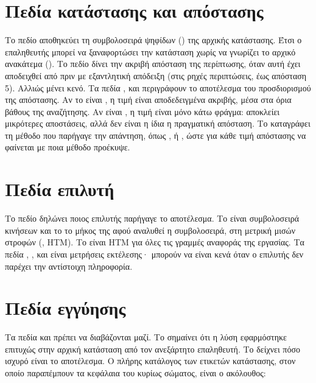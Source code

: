 \section{Πεδία κατάστασης και απόστασης}
\label{sec:schema-distance}
Το πεδίο  αποθηκεύει τη συμβολοσειρά ψηφίδων () της αρχικής κατάστασης. Έτσι ο επαληθευτής μπορεί να ξαναφορτώσει την κατάσταση χωρίς να γνωρίζει το αρχικό ανακάτεμα (). Το πεδίο  δίνει την ακριβή απόσταση της περίπτωσης, όταν αυτή έχει αποδειχθεί από πριν με εξαντλητική απόδειξη (στις ρηχές περιπτώσεις, έως απόσταση 5). Αλλιώς μένει κενό. Τα πεδία ,  και  περιγράφουν το αποτέλεσμα του προσδιορισμού της απόστασης. Αν το  είναι , η τιμή είναι αποδεδειγμένα ακριβής, μέσα στα όρια βάθους της αναζήτησης. Αν είναι , η τιμή είναι μόνο κάτω φράγμα: αποκλείει μικρότερες αποστάσεις, αλλά δεν είναι η ίδια η πραγματική απόσταση. Το  καταγράφει τη μέθοδο που παρήγαγε την απάντηση, όπως ,  ή , ώστε για κάθε τιμή απόστασης να φαίνεται με ποια μέθοδο προέκυψε.

\section{Πεδία επιλυτή}
\label{sec:schema-solver}
Το πεδίο  δηλώνει ποιος επιλυτής παρήγαγε το αποτέλεσμα. Το  είναι συμβολοσειρά κινήσεων και το  το μήκος της αφού αναλυθεί η συμβολοσειρά, στη μετρική μισών στροφών (, HTM). Το  είναι HTM για όλες τις γραμμές αναφοράς της εργασίας. Τα πεδία , ,  και  είναι μετρήσεις εκτέλεσης· μπορούν να είναι κενά όταν ο επιλυτής δεν παρέχει την αντίστοιχη πληροφορία.

\section{Πεδία εγγύησης}
\label{sec:schema-status}
Τα πεδία  και  πρέπει να διαβάζονται μαζί. Το  σημαίνει ότι η λύση εφαρμόστηκε επιτυχώς στην αρχική κατάσταση από τον ανεξάρτητο επαληθευτή. Το  δείχνει πόσο ισχυρό είναι το αποτέλεσμα. Ο πλήρης κατάλογος των ετικετών κατάστασης, στον οποίο παραπέμπουν τα κεφάλαια του κυρίως σώματος, είναι ο ακόλουθος:

